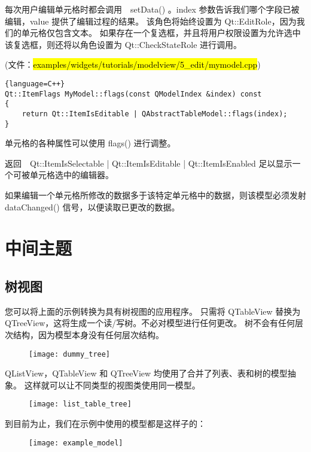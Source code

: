 每次用户编辑单元格时都会调用　setData() 。index 参数告诉我们哪个字段已被编辑，value 提供了编辑过程的结果。
该角色将始终设置为 Qt::EditRole，因为我们的单元格仅包含文本。
如果存在一个复选框，并且将用户权限设置为允许选中该复选框，则还将以角色设置为 Qt::CheckStateRole 进行调用。

(文件：\hl{examples/widgets/tutorials/modelview/5\_edit/mymodel.cpp})

\begin{lstlisting}{language=C++}
Qt::ItemFlags MyModel::flags(const QModelIndex &index) const
{
    return Qt::ItemIsEditable | QAbstractTableModel::flags(index);
}
\end{lstlisting}

单元格的各种属性可以使用 flags() 进行调整。

返回　Qt::ItemIsSelectable | Qt::ItemIsEditable | Qt::ItemIsEnabled 足以显示一个可被单元格选中的编辑器。

如果编辑一个单元格所修改的数据多于该特定单元格中的数据，则该模型必须发射　dataChanged() 信号，以便读取已更改的数据。

\section{中间主题}

\subsection{树视图}

您可以将上面的示例转换为具有树视图的应用程序。
只需将 QTableView 替换为 QTreeView，这将生成一个读/写树。不必对模型进行任何更改。
树不会有任何层次结构，因为模型本身没有任何层次结构。

\begin{figure}[hbt!]  
\texttt{[image: dummy\_tree]}
\end{figure}


QListView，QTableView 和 QTreeView 均使用了合并了列表、表和树的模型抽象。
这样就可以让不同类型的视图类使用同一模型。

\begin{figure}[hbt!]  
\texttt{[image: list\_table\_tree]}
\end{figure}

到目前为止，我们在示例中使用的模型都是这样子的：

\begin{figure}[hbt!]  
\texttt{[image: example\_model]}
\end{figure}

